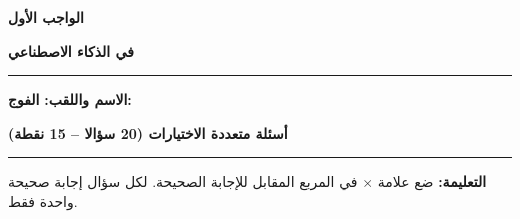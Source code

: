\documentclass[a4paper]{article}
\newif\ifcorrection
\begin{document}
\begin{center}

{\Large\khatt\textbf{الواجب الأول}\ifcorrection\ \textbf{-- التصحيح النموذجي}\fi}

\vspace{0.2cm}

{\Large\khatt\textbf{في الذكاء الاصطناعي}}

\end{center}

\rule{\textwidth}{1pt}

\ifcorrection\else
\textbf{الاسم واللقب:} \dotfill \quad \textbf{الفوج:} \makebox[3cm]{\dotfill}

\vspace{0.3cm}
\fi

\begin{center}

{\khatt\textbf{أسئلة متعددة الاختيارات (20 سؤالا -- 15 نقطة)}}

\end{center}

\rule{\textwidth}{1pt}

\textbf{التعليمة:} ضع علامة \textbf{$\times$} في المربع المقابل للإجابة الصحيحة. لكل سؤال إجابة صحيحة واحدة فقط.

\vspace{0.3cm}
\end{document}
